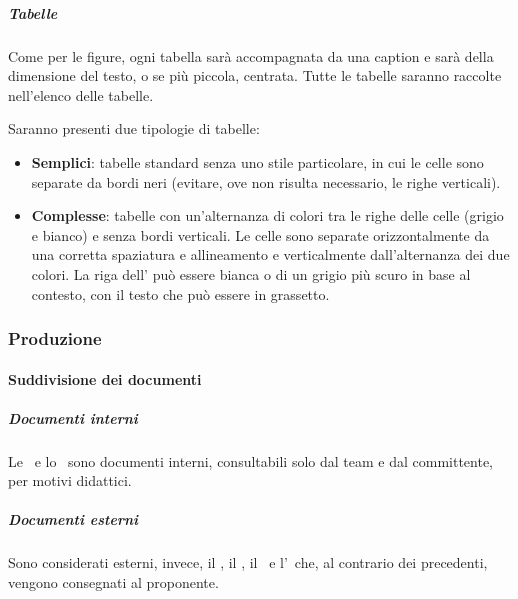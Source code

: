 			\subparagraph{Tabelle}\label{StrumentiDiSupportoTabelle}
			Come per le figure, ogni tabella sarà accompagnata da una caption e sarà della dimensione del testo, o se più piccola, centrata.
			Tutte le tabelle saranno raccolte nell'elenco delle tabelle.\par
			Saranno presenti due tipologie di tabelle:
			\begin{itemize}
				\item \textbf{Semplici}: tabelle standard senza uno stile particolare, in cui le celle sono separate da bordi neri (evitare, ove non risulta necessario,
					le righe verticali).
				\item \textbf{Complesse}: tabelle con un'alternanza di colori tra le righe delle celle (grigio e bianco) e senza bordi verticali.
					Le celle sono separate orizzontalmente da una corretta spaziatura e allineamento e verticalmente dall'alternanza dei due colori.
					La riga dell' può essere bianca o di un grigio più scuro in base al contesto, con il testo che può essere in grassetto.
			\end{itemize}


		\subsubsection{Produzione}

			\paragraph{Suddivisione dei documenti}\label{SuddivisioneDeiDocumenti}

			\subparagraph{Documenti interni}
			Le \NdP\ e lo \SdF\ sono documenti interni, consultabili solo dal team e dal committente, per motivi didattici.

			\subparagraph{Documenti esterni}
			Sono considerati esterni, invece, il \PdP, il \PdQ, il \Gl\ e l'\AdR\ che, al contrario dei precedenti, vengono consegnati al proponente.


